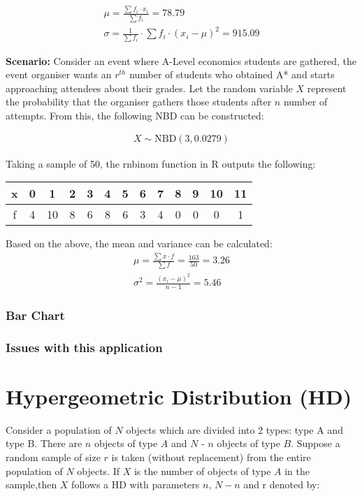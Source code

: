 \documentclass{article}
\begin{document}
\begin{gather*}
  \mu = \frac{\sum {f_i \cdot x_i}}{\sum f_i} = 78.79 \\[5pt]
  \sigma = \frac{1}{\sum f_i} \cdot \sum {f_i \cdot (x_i - \mu)^2} = 915.09
\end{gather*}

\textbf{Scenario:} Consider an event
where A-Level economics students are gathered, the event organiser
wants an $ r^{th} $ number of students who obtained A* and starts 
approaching attendees about their grades. Let the random variable
$ X $ represent the probability that the organiser gathers
those students after $ n $ number of attempts. From this, the
following NBD can be constructed:

\begin{gather*}
  X \sim \text{NBD}(3, 0.0279)
\end{gather*}

Taking a sample of 50, the rnbinom function in R outputs the following:

\begin{center}
  \begin{tabular}{|c|c|c|c|c|c|c|c|c|c|c|c|c|}
    \hline
    x & 0 & 1 & 2 & 3 & 4 & 5 & 6 & 7 & 8 & 9 & 10 & 11 \\
    \hline
    f & 4 & 10 & 8 & 6 & 8 & 6 & 3 & 4 & 0 & 0 & 0 & 1\\
    \hline
  \end{tabular}
\end{center}

Based on the above, the mean and variance can be calculated:
\begin{gather*}
  \mu = \frac{\sum x \cdot f}{\sum f} = \frac{163}{50} = 3.26 \\[5pt]
  \sigma^2 = \frac{(x_i - \mu)^2}{n - 1} = 5.46
\end{gather*}

\subsubsection{Bar Chart}

\subsubsection{Issues with this application}

\section{Hypergeometric Distribution (HD)}
Consider a population of $N$ objects which are divided into 2 types: type A and type B.
There are
$n$ objects of type $A$ and $N$ - $n$ objects of type $B$.
Suppose a random sample of size $r$ is taken
(without replacement) from the entire population of $N$ objects. If $X$ 
is the number of objects of
type $A$ in the sample,then $X$ follows a HD with parameters $n$, 
$N-n$ and r denoted by:
\end{document}
